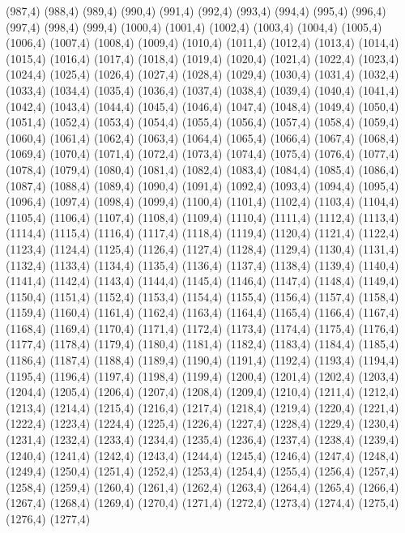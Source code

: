 (987,4)
(988,4)
(989,4)
(990,4)
(991,4)
(992,4)
(993,4)
(994,4)
(995,4)
(996,4)
(997,4)
(998,4)
(999,4)
(1000,4)
(1001,4)
(1002,4)
(1003,4)
(1004,4)
(1005,4)
(1006,4)
(1007,4)
(1008,4)
(1009,4)
(1010,4)
(1011,4)
(1012,4)
(1013,4)
(1014,4)
(1015,4)
(1016,4)
(1017,4)
(1018,4)
(1019,4)
(1020,4)
(1021,4)
(1022,4)
(1023,4)
(1024,4)
(1025,4)
(1026,4)
(1027,4)
(1028,4)
(1029,4)
(1030,4)
(1031,4)
(1032,4)
(1033,4)
(1034,4)
(1035,4)
(1036,4)
(1037,4)
(1038,4)
(1039,4)
(1040,4)
(1041,4)
(1042,4)
(1043,4)
(1044,4)
(1045,4)
(1046,4)
(1047,4)
(1048,4)
(1049,4)
(1050,4)
(1051,4)
(1052,4)
(1053,4)
(1054,4)
(1055,4)
(1056,4)
(1057,4)
(1058,4)
(1059,4)
(1060,4)
(1061,4)
(1062,4)
(1063,4)
(1064,4)
(1065,4)
(1066,4)
(1067,4)
(1068,4)
(1069,4)
(1070,4)
(1071,4)
(1072,4)
(1073,4)
(1074,4)
(1075,4)
(1076,4)
(1077,4)
(1078,4)
(1079,4)
(1080,4)
(1081,4)
(1082,4)
(1083,4)
(1084,4)
(1085,4)
(1086,4)
(1087,4)
(1088,4)
(1089,4)
(1090,4)
(1091,4)
(1092,4)
(1093,4)
(1094,4)
(1095,4)
(1096,4)
(1097,4)
(1098,4)
(1099,4)
(1100,4)
(1101,4)
(1102,4)
(1103,4)
(1104,4)
(1105,4)
(1106,4)
(1107,4)
(1108,4)
(1109,4)
(1110,4)
(1111,4)
(1112,4)
(1113,4)
(1114,4)
(1115,4)
(1116,4)
(1117,4)
(1118,4)
(1119,4)
(1120,4)
(1121,4)
(1122,4)
(1123,4)
(1124,4)
(1125,4)
(1126,4)
(1127,4)
(1128,4)
(1129,4)
(1130,4)
(1131,4)
(1132,4)
(1133,4)
(1134,4)
(1135,4)
(1136,4)
(1137,4)
(1138,4)
(1139,4)
(1140,4)
(1141,4)
(1142,4)
(1143,4)
(1144,4)
(1145,4)
(1146,4)
(1147,4)
(1148,4)
(1149,4)
(1150,4)
(1151,4)
(1152,4)
(1153,4)
(1154,4)
(1155,4)
(1156,4)
(1157,4)
(1158,4)
(1159,4)
(1160,4)
(1161,4)
(1162,4)
(1163,4)
(1164,4)
(1165,4)
(1166,4)
(1167,4)
(1168,4)
(1169,4)
(1170,4)
(1171,4)
(1172,4)
(1173,4)
(1174,4)
(1175,4)
(1176,4)
(1177,4)
(1178,4)
(1179,4)
(1180,4)
(1181,4)
(1182,4)
(1183,4)
(1184,4)
(1185,4)
(1186,4)
(1187,4)
(1188,4)
(1189,4)
(1190,4)
(1191,4)
(1192,4)
(1193,4)
(1194,4)
(1195,4)
(1196,4)
(1197,4)
(1198,4)
(1199,4)
(1200,4)
(1201,4)
(1202,4)
(1203,4)
(1204,4)
(1205,4)
(1206,4)
(1207,4)
(1208,4)
(1209,4)
(1210,4)
(1211,4)
(1212,4)
(1213,4)
(1214,4)
(1215,4)
(1216,4)
(1217,4)
(1218,4)
(1219,4)
(1220,4)
(1221,4)
(1222,4)
(1223,4)
(1224,4)
(1225,4)
(1226,4)
(1227,4)
(1228,4)
(1229,4)
(1230,4)
(1231,4)
(1232,4)
(1233,4)
(1234,4)
(1235,4)
(1236,4)
(1237,4)
(1238,4)
(1239,4)
(1240,4)
(1241,4)
(1242,4)
(1243,4)
(1244,4)
(1245,4)
(1246,4)
(1247,4)
(1248,4)
(1249,4)
(1250,4)
(1251,4)
(1252,4)
(1253,4)
(1254,4)
(1255,4)
(1256,4)
(1257,4)
(1258,4)
(1259,4)
(1260,4)
(1261,4)
(1262,4)
(1263,4)
(1264,4)
(1265,4)
(1266,4)
(1267,4)
(1268,4)
(1269,4)
(1270,4)
(1271,4)
(1272,4)
(1273,4)
(1274,4)
(1275,4)
(1276,4)
(1277,4)
